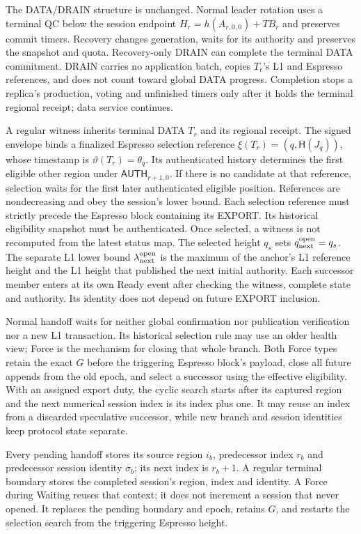 \documentclass[11pt,a4paper]{article}
\newcommand{\api}[1]{\ensuremath{\mathsf{#1}}}
\newcommand{\Hash}{\mathsf H}
\newcommand{\TB}{\mathit{TB}}
\begin{document}
The DATA/DRAIN structure is unchanged. Normal leader rotation uses a
terminal QC below the session endpoint
$H_r=h(A_{r,0,0})+\TB_r$ and preserves commit timers. Recovery changes
generation, waits for its authority and preserves the snapshot and
quota. Recovery-only DRAIN can complete the terminal DATA commitment.
DRAIN carries no application batch, copies $T_r$'s L1 and Espresso
references, and does not count toward global DATA progress. Completion stops a replica's production, voting and
unfinished timers only after it holds the terminal regional receipt;
data service continues.

A regular witness inherits terminal DATA $T_r$ and its regional receipt.
The signed envelope binds a finalized Espresso selection reference
$\xi(T_r)=(q,\Hash(J_q))$, whose timestamp is $\vartheta(T_r)=\theta_q$.
Its authenticated history determines the first eligible other region
under $\api{AUTH}_{r+1,0}$. If there is no candidate at that reference,
selection waits for the first later authenticated eligible position.
References are nondecreasing and obey the session's lower bound. Each
selection reference must strictly precede the Espresso block containing
its EXPORT. Its historical eligibility snapshot must be authenticated.
Once selected, a witness is not recomputed from the latest status map.
The selected height $q_s$ sets $q^{\rm open}_{\rm next}=q_s$. The
separate L1 lower bound $\lambda^{\rm open}_{\rm next}$ is the maximum
of the anchor's L1 reference height and the L1 height that published
the next initial authority.
Each successor member enters at its own Ready event after checking the
witness, complete state and authority. Its identity does not depend on
future EXPORT inclusion.

Normal handoff waits for neither global confirmation nor publication
verification nor a new L1 transaction. Its historical selection rule
may use an older health view; Force is the mechanism for closing that
whole branch. Both Force types retain the exact $G$ before the triggering
Espresso block's payload, close all future appends from the old epoch,
and select a successor using the effective eligibility. With an assigned
export duty, the cyclic search starts after its captured region and the
next numerical session index is its index plus one. It may reuse an
index from a discarded speculative successor, while new branch and
session identities keep protocol state separate.

Every pending handoff stores its source region $i_b$, predecessor index
$r_b$ and predecessor session identity $\sigma_b$; its next index is
$r_b+1$. A regular terminal boundary stores the completed session's
region, index and identity. A Force during Waiting reuses
that context; it does not increment a session that never opened. It
replaces the pending boundary and epoch, retains $G$, and restarts the
selection search from the triggering Espresso height.
\end{document}

